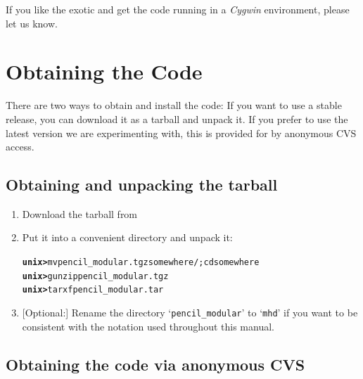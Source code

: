 \documentclass[12pt,twoside,notitlepage,a4paper]{article}
\newcommand{\prompt}[1]{{\ttfamily\bfseries{}#1}}
\newcommand{\file}[1]{`\texttt{#1}'}
\newcommand{\name}[1]{\textsl{#1}\index{#1}\/}
\begin{document}
If you like the exotic and get the code running in a \name{Cygwin}
environment, please let us know.



\section{Obtaining the Code}

There are two ways to obtain and install the code: If you want to use a
stable release, you can download it as a tarball and unpack it.
If you prefer to use the latest version we are experimenting with,
this is provided for by anonymous CVS access.


\subsection{Obtaining and unpacking the tarball}

\begin{enumerate}
\item Download the tarball from
\item Put it into a convenient directory and unpack it:
  \begin{alltt}
  \prompt{unix> } mv pencil_modular.tgz somewhere/; cd somewhere
  \prompt{unix> } gunzip pencil_modular.tgz
  \prompt{unix> } tar xf pencil_modular.tar \
  \end{alltt}
\item {}[Optional:] Rename the directory \file{pencil_modular} to \file{mhd}
  if you want to be consistent with the notation used throughout this
  manual.
\end{enumerate}


\subsection{Obtaining the code via anonymous CVS}
\end{document}
